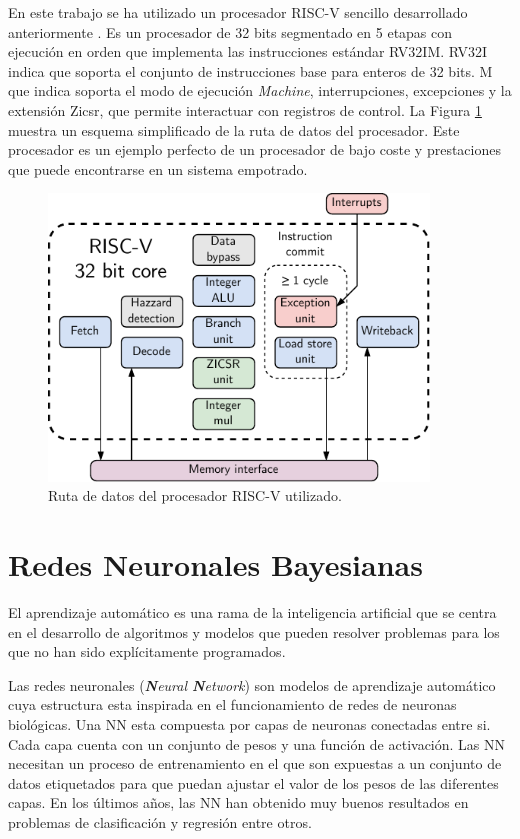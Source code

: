 En este trabajo se ha utilizado un procesador RISC-V sencillo desarrollado anteriormente \cite{riscv_tfg}. Es un procesador de 32 bits segmentado en 5 etapas con ejecución en orden que implementa las instrucciones estándar RV32IM. RV32I indica que soporta el conjunto de instrucciones base para enteros de 32 bits. M que indica soporta el modo de ejecución \textit{Machine}, interrupciones, excepciones y la extensión Zicsr, que permite interactuar con registros de control. La Figura \ref{fig:riscv_data_pipeline} muestra un esquema simplificado de la ruta de datos del procesador. Este procesador es un ejemplo perfecto de un procesador de bajo coste y prestaciones que puede encontrarse en un sistema empotrado.

\begin{figure}[h]
    \centering
    \includegraphics[width=0.9\textwidth]{Imagenes/riscv_core.pdf}
    \caption{Ruta de datos del procesador RISC-V utilizado.}
    \label{fig:riscv_data_pipeline}
\end{figure}

\section{Redes Neuronales Bayesianas}

El aprendizaje automático es una rama de la inteligencia artificial que se centra en el desarrollo de algoritmos y modelos que pueden resolver problemas para los que no han sido explícitamente programados.

Las redes neuronales (\textit{\textbf{N}eural \textbf{N}etwork}) son modelos de aprendizaje automático cuya estructura esta inspirada en el funcionamiento de redes de neuronas biológicas. Una NN esta compuesta por capas de neuronas conectadas entre si. Cada capa cuenta con un conjunto de pesos y una función de activación. Las NN necesitan un proceso de entrenamiento en el que son expuestas a un conjunto de datos etiquetados para que puedan ajustar el valor de los pesos de las diferentes capas. En los últimos años, las NN han obtenido muy buenos resultados en problemas de clasificación y regresión entre otros.

